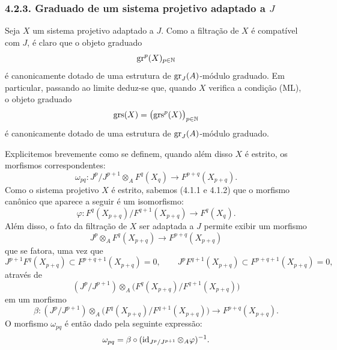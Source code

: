 \subsubsection*{4.2.3. Graduado de um sistema projetivo adaptado a \(J\)}
Seja \(X\) um sistema projetivo adaptado a \(J\). Como a filtração de \(X\) é compatível com \(J\), é claro que o objeto graduado
\[
\operatorname{gr}^p(X)_{p\in\mathbb N}
\]
é canonicamente dotado de uma estrutura de \(\operatorname{gr}_J(A)\)-módulo graduado. Em particular, passando ao limite deduz-se que, quando \(X\) verifica a condição (ML), o objeto graduado
\[
\operatorname{grs}(X)=\bigl(\operatorname{grs}^p(X)\bigr)_{p\in\mathbb N}
\]
é canonicamente dotado de uma estrutura de \(\operatorname{gr}_J(A)\)-módulo graduado.

Explicitemos brevemente como se definem, quando além disso \(X\) é estrito, os morfismos correspondentes:
\[
\omega_{pq}: J^p/J^{p+1}\otimes_A F^q(X_q)\longrightarrow F^{p+q}(X_{p+q}).
\]
Como o sistema projetivo \(X\) é estrito, sabemos (4.1.1 e 4.1.2) que o morfismo canônico que aparece a seguir é um isomorfismo:
\[
\varphi:F^q(X_{p+q})/F^{q+1}(X_{p+q})\longrightarrow F^q(X_q).
\]
Além disso, o fato da filtração de \(X\) ser adaptada a \(J\) permite exibir um morfismo
\[
J^p\otimes_A F^q(X_{p+q})\longrightarrow F^{p+q}(X_{p+q})
\]
que se fatora, uma vez que
\[
J^{p+1}F^q(X_{p+q})\subset F^{p+q+1}(X_{p+q})=0,\qquad
J^pF^{q+1}(X_{p+q})\subset F^{p+q+1}(X_{p+q})=0,
\]
através de
\[
(J^p/J^{p+1})\otimes_A
\bigl(F^q(X_{p+q})/F^{q+1}(X_{p+q})\bigr)
\]
em um morfismo
\[
\beta:(J^p/J^{p+1})\otimes_A
\bigl(F^q(X_{p+q})/F^{q+1}(X_{p+q})\bigr)
\longrightarrow F^{p+q}(X_{p+q}).
\]
O morfismo \(\omega_{pq}\) é então dado pela seguinte expressão:
\[
\omega_{pq}=\beta\circ(\operatorname{id}_{J^p/J^{p+1}}\otimes_A\varphi)^{-1}.
\]
